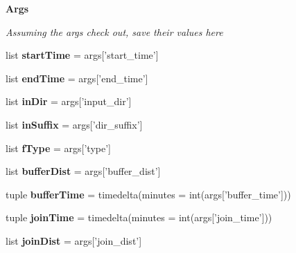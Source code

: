 \begin{Indent}{\bf Args}\par
{\em Assuming the args check out, save their values here }\begin{DoxyCompactItemize}
\item 
\hypertarget{namespacebest__track_ad6ae8bee471b5bddf50647ac040d9a40}{list {\bfseries start\-Time} = args\mbox{[}'start\-\_\-time'\mbox{]}}\label{namespacebest__track_ad6ae8bee471b5bddf50647ac040d9a40}

\item 
\hypertarget{namespacebest__track_a4fe0247c5d515b7e973785b4dce1c735}{list {\bfseries end\-Time} = args\mbox{[}'end\-\_\-time'\mbox{]}}\label{namespacebest__track_a4fe0247c5d515b7e973785b4dce1c735}

\item 
\hypertarget{namespacebest__track_a5d77764f37b0309d6e0522ba33ab84e3}{list {\bfseries in\-Dir} = args\mbox{[}'input\-\_\-dir'\mbox{]}}\label{namespacebest__track_a5d77764f37b0309d6e0522ba33ab84e3}

\item 
\hypertarget{namespacebest__track_a24d0326e693edc1f3e51c3a902751e20}{list {\bfseries in\-Suffix} = args\mbox{[}'dir\-\_\-suffix'\mbox{]}}\label{namespacebest__track_a24d0326e693edc1f3e51c3a902751e20}

\item 
\hypertarget{namespacebest__track_aba3d50b695b80364b8c8cfce1157b105}{list {\bfseries f\-Type} = args\mbox{[}'type'\mbox{]}}\label{namespacebest__track_aba3d50b695b80364b8c8cfce1157b105}

\item 
\hypertarget{namespacebest__track_ae80569570623ae1c56d00c465da193ef}{list {\bfseries buffer\-Dist} = args\mbox{[}'buffer\-\_\-dist'\mbox{]}}\label{namespacebest__track_ae80569570623ae1c56d00c465da193ef}

\item 
\hypertarget{namespacebest__track_af9ffa5447ddb37563158b5e41eddddc5}{tuple {\bfseries buffer\-Time} = timedelta(minutes = int(args\mbox{[}'buffer\-\_\-time'\mbox{]}))}\label{namespacebest__track_af9ffa5447ddb37563158b5e41eddddc5}

\item 
\hypertarget{namespacebest__track_a8cfa3b07abdc4bed67ad4b8350e306f5}{tuple {\bfseries join\-Time} = timedelta(minutes = int(args\mbox{[}'join\-\_\-time'\mbox{]}))}\label{namespacebest__track_a8cfa3b07abdc4bed67ad4b8350e306f5}

\item 
\hypertarget{namespacebest__track_a6176736eb54a3f7a6c06b41f3a33d88f}{list {\bfseries join\-Dist} = args\mbox{[}'join\-\_\-dist'\mbox{]}}\label{namespacebest__track_a6176736eb54a3f7a6c06b41f3a33d88f}


\end{DoxyCompactItemize}
\end{Indent}
